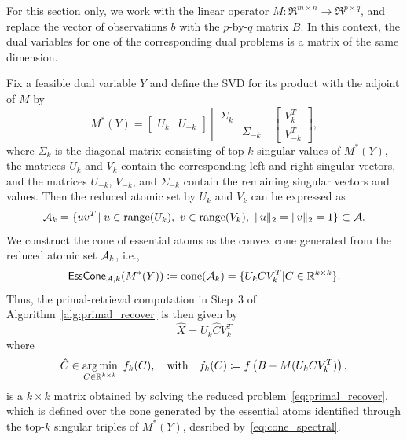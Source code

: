 For this section only, we work with the linear operator $M:\Re^{m\times n}\to\Re^{p\times q}$, and replace the vector of observations $b$ with the $p$-by-$q$ matrix $B$. In this context, the dual variables for one of the corresponding dual problems is a matrix of the same dimension.

Fix a feasible dual variable $Y$ and define the SVD for its product with the adjoint of $M$ by
\begin{equation}\label{eq-svd}
   M^*(Y) = 
\begin{bmatrix}
    U_k & U_{-k}
\end{bmatrix}
\begin{bmatrix}
    \Sigma_k &          \\ 
             &  \Sigma_{-k}
\end{bmatrix}
\begin{bmatrix}
    V_k^T \\ 
    V_{-k}^T
\end{bmatrix},
\end{equation}
where $\Sigma_k$ is the diagonal matrix consisting of top-$k$ singular values of $M^*(Y)$, the matrices $U_k$ and $V_k$ contain the corresponding left and right singular vectors, and the matrices $U_{-k}$, $V_{-k}$, and $\Sigma_{-k}$ contain the remaining singular vectors and values. Then the reduced atomic set by $U_k$ and $V_k$ can be expressed as 
\[
  \mathcal{A}_k = \{ uv^T\! \mid u\in\operatorname{range}(U_k),\ v\in\operatorname{range}(V_k),\ \|u\|_2=\|v\|_2=1\} \subset \mathcal{A}.
\]
We construct the cone of essential atoms as the convex cone generated from the reduced atomic set $\mathcal{A}_k$, i.e.,
\begin{equation} \label{eq:cone_spectral}
    \operatorname{\sf EssCone}_{\mathcal{A}, k}(M^*(Y)) \coloneqq \operatorname{cone}(\mathcal{A}_k) = \{U_k C V_k^T | C \in \mathbb{R}^{k\times k}\}.
\end{equation}
Thus, the primal-retrieval computation in Step~3 of Algorithm~\ref{alg:primal_recover} is then given by 
\begin{equation}\label{eq:unsymm-recovered-soln} 
  \hat X = U_k\hat C V_k^T
\end{equation}
where
\begin{equation}\label{eq-spectral-reduced}
  \hat C \in \underset{C\in\mathbb{R}^{k\times k}}{\textrm{arg}\,{\min}}\enskip f_k(C), \hbox{\quad with\quad} f_k(C) \coloneqq f\left( B - M(U_k C V_k^T) \right),
\end{equation}
is a $k\times k$ matrix obtained by solving the reduced problem~\eqref{eq:primal_recover}, which is defined over the cone generated by the essential atoms identified through the top-$k$ singular triples of $M^*(Y)$, desribed by~\eqref{eq:cone_spectral}.


